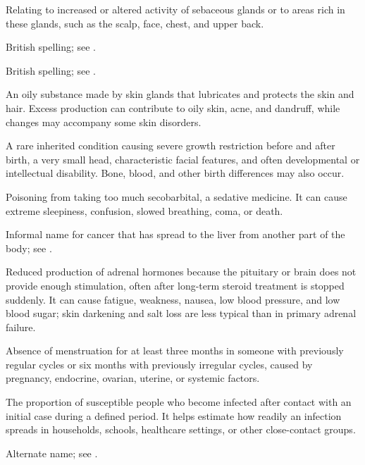  Relating to increased or altered activity of sebaceous glands or to areas rich in these glands, such as the scalp, face, chest, and upper back.

 British spelling; see .

 British spelling; see .

 An oily substance made by skin glands that lubricates and protects the skin and hair. Excess production can contribute to oily skin, acne, and dandruff, while changes may accompany some skin disorders.

 A rare inherited condition causing severe growth restriction before and after birth, a very small head, characteristic facial features, and often developmental or intellectual disability. Bone, blood, and other birth differences may also occur.

 Poisoning from taking too much secobarbital, a sedative medicine. It can cause extreme sleepiness, confusion, slowed breathing, coma, or death.

 Informal name for cancer that has spread to the liver from another part of the body; see .

 Reduced production of adrenal hormones because the pituitary or brain does not provide enough stimulation, often after long-term steroid treatment is stopped suddenly. It can cause fatigue, weakness, nausea, low blood pressure, and low blood sugar; skin darkening and salt loss are less typical than in primary adrenal failure.

 Absence of menstruation for at least three months in someone with previously regular cycles or six months with previously irregular cycles, caused by pregnancy, endocrine, ovarian, uterine, or systemic factors.

 The proportion of susceptible people who become infected after contact with an initial case during a defined period. It helps estimate how readily an infection spreads in households, schools, healthcare settings, or other close-contact groups.

 Alternate name; see .

